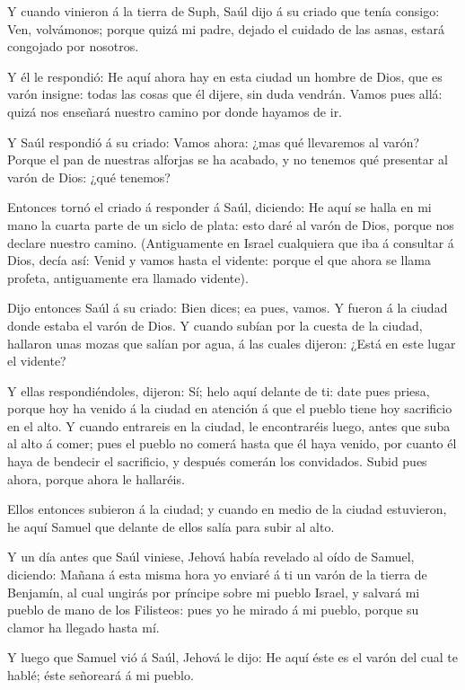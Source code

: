  Y cuando vinieron á la tierra de Suph, Saúl dijo á su
criado que tenía consigo: Ven, volvámonos; porque quizá mi padre, dejado
el cuidado de las asnas, estará congojado por nosotros.

 Y él le respondió: He aquí ahora hay en esta ciudad un
hombre de Dios, que es varón insigne: todas las cosas que él dijere, sin
duda vendrán. Vamos pues allá: quizá nos enseñará nuestro camino por
donde hayamos de ir.

 Y Saúl respondió á su criado: Vamos ahora: ¿mas qué
llevaremos al varón? Porque el pan de nuestras alforjas se ha acabado, y
no tenemos qué presentar al varón de Dios: ¿qué tenemos?

 Entonces tornó el criado á responder á Saúl, diciendo: He
aquí se halla en mi mano la cuarta parte de un siclo de plata: esto daré
al varón de Dios, porque nos declare nuestro camino. 
(Antiguamente en Israel cualquiera que iba á consultar á Dios, decía
así: Venid y vamos hasta el vidente: porque el que ahora se llama
profeta, antiguamente era llamado vidente).

 Dijo entonces Saúl á su criado: Bien dices; ea pues,
vamos. Y fueron á la ciudad donde estaba el varón de Dios. 
Y cuando subían por la cuesta de la ciudad, hallaron unas mozas que
salían por agua, á las cuales dijeron: ¿Está en este lugar el vidente?

 Y ellas respondiéndoles, dijeron: Sí; helo aquí delante de
ti: date pues priesa, porque hoy ha venido á la ciudad en atención á que
el pueblo tiene hoy sacrificio en el alto.  Y cuando
entrareis en la ciudad, le encontraréis luego, antes que suba al alto á
comer; pues el pueblo no comerá hasta que él haya venido, por cuanto él
haya de bendecir el sacrificio, y después comerán los convidados. Subid
pues ahora, porque ahora le hallaréis.

 Ellos entonces subieron á la ciudad; y cuando en medio de
la ciudad estuvieron, he aquí Samuel que delante de ellos salía para
subir al alto.

 Y un día antes que Saúl viniese, Jehová había revelado al
oído de Samuel, diciendo:  Mañana á esta misma hora yo
enviaré á ti un varón de la tierra de Benjamín, al cual ungirás por
príncipe sobre mi pueblo Israel, y salvará mi pueblo de mano de los
Filisteos: pues yo he mirado á mi pueblo, porque su clamor ha llegado
hasta mí.

 Y luego que Samuel vió á Saúl, Jehová le dijo: He aquí
éste es el varón del cual te hablé; éste señoreará á mi pueblo.

